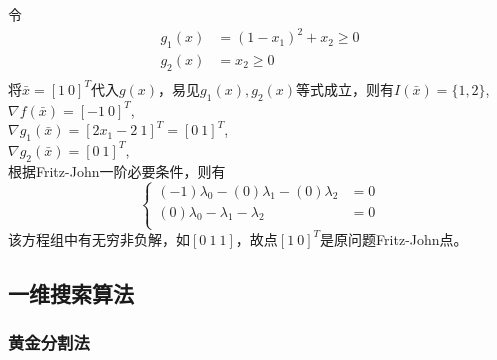 \begin{solution}
    令
    \begin{align*}
        g_1(x)&=(1 - x_1)^2 + x_2\geq 0\\
        g_2(x)&=x_2\geq0\\
    \end{align*}
    将$\bar{x}=[1\ 0]^T$代入$g(x)$，易见$g_1(x),g_2(x)$等式成立，则有$I(\bar{x})=\{1,2\}$,\\
    $\nabla f(\bar{x})=[-1\ 0]^T$,\\
    $\nabla g_1(\bar{x})=[2x_1-2\ 1]^T=[0\ 1]^T$,\\
    $\nabla g_2(\bar{x})=[0\ 1]^T$,\\
    根据Fritz-John一阶必要条件，则有
    $$\left\{
    \begin{aligned}
        (-1)\lambda_0 - (0)\lambda_1 - (0)\lambda_2 &=0\\
        (0)\lambda_0 - \lambda_1 - \lambda_2 &=0\\
    \end{aligned}\right.$$
    该方程组中有无穷非负解，如$[0\ 1\ 1]$，故点$[1\ 0]^T$是原问题Fritz-John点。
\end{solution}

\subsection{一维搜索算法}

\subsubsection{黄金分割法}

